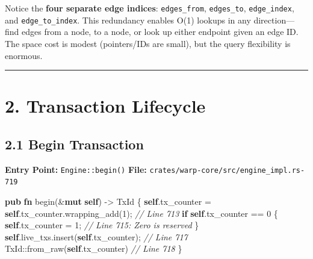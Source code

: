 \documentclass[11pt]{book}
\newenvironment{Shaded}{}{}
\newcommand{\CommentTok}[1]{\textcolor[rgb]{0.38,0.63,0.69}{\textit{#1}}}
\newcommand{\ControlFlowTok}[1]{\textcolor[rgb]{0.00,0.44,0.13}{\textbf{#1}}}
\newcommand{\DecValTok}[1]{\textcolor[rgb]{0.25,0.63,0.44}{#1}}
\newcommand{\KeywordTok}[1]{\textcolor[rgb]{0.00,0.44,0.13}{\textbf{#1}}}
\newcommand{\NormalTok}[1]{#1}
\newcommand{\OperatorTok}[1]{\textcolor[rgb]{0.40,0.40,0.40}{#1}}
\newcommand{\PreprocessorTok}[1]{\textcolor[rgb]{0.74,0.48,0.00}{#1}}
\begin{document}
\begin{tourguide}
Notice the \textbf{four separate edge indices}: \texttt{edges\_from}, \texttt{edges\_to}, \texttt{edge\_index}, and \texttt{edge\_to\_index}. This redundancy enables O(1) lookups in any direction---find edges from a node, to a node, or look up either endpoint given an edge ID. The space cost is modest (pointers/IDs are small), but the query flexibility is enormous.
\end{tourguide}

\begin{center}\rule{0.5\linewidth}{0.5pt}\end{center}

\section{2. Transaction Lifecycle}\label{transaction-lifecycle}

\subsection{2.1 Begin Transaction}\label{begin-transaction}

\textbf{Entry Point:} \texttt{Engine::begin()} \textbf{File:}
\texttt{crates/warp-core/src/engine\_impl.rs-719}

\begin{Shaded}
\begin{Highlighting}[]
\KeywordTok{pub} \KeywordTok{fn}\NormalTok{ begin(}\OperatorTok{\&}\KeywordTok{mut} \KeywordTok{self}\NormalTok{) }\OperatorTok{{-}\textgreater{}}\NormalTok{ TxId }\OperatorTok{\{}
    \KeywordTok{self}\OperatorTok{.}\NormalTok{tx\_counter }\OperatorTok{=} \KeywordTok{self}\OperatorTok{.}\NormalTok{tx\_counter}\OperatorTok{.}\NormalTok{wrapping\_add(}\DecValTok{1}\NormalTok{)}\OperatorTok{;}  \CommentTok{// Line 713}
    \ControlFlowTok{if} \KeywordTok{self}\OperatorTok{.}\NormalTok{tx\_counter }\OperatorTok{==} \DecValTok{0} \OperatorTok{\{}
        \KeywordTok{self}\OperatorTok{.}\NormalTok{tx\_counter }\OperatorTok{=} \DecValTok{1}\OperatorTok{;}                            \CommentTok{// Line 715: Zero is reserved}
    \OperatorTok{\}}
    \KeywordTok{self}\OperatorTok{.}\NormalTok{live\_txs}\OperatorTok{.}\NormalTok{insert(}\KeywordTok{self}\OperatorTok{.}\NormalTok{tx\_counter)}\OperatorTok{;}              \CommentTok{// Line 717}
    \PreprocessorTok{TxId::}\NormalTok{from\_raw(}\KeywordTok{self}\OperatorTok{.}\NormalTok{tx\_counter)                     }\CommentTok{// Line 718}
\OperatorTok{\}}
\end{Highlighting}
\end{Shaded}
\end{document}
